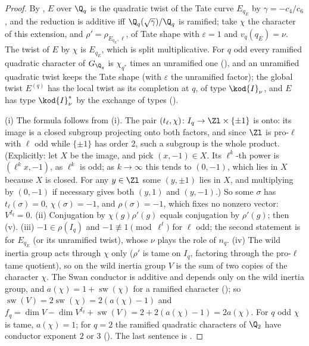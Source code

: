 \begin{proof}
By , $E$ over $\Q_q$ is the quadratic twist of the Tate curve $E_{q_E}$ by $\gamma=-c_4/c_6$, and the reduction is additive iff
$\Q_q(\sqrt\gamma)/\Q_q$ is ramified; take $\chi$ the character of this extension, and $\rho'=\rho_{E_{q_E},\ell}$, of Tate shape with $\varepsilon=1$ and
$v_q(q_E)=\nu$. The twist of $E$ by $\chi$ is $E_{q_E}$, which is split multiplicative. For $q$ odd every ramified quadratic character of $G_{\Q_q}$ is
$\chi_{q^*}$ times an unramified one (), and an unramified quadratic twist keeps the Tate shape (with $\varepsilon$ the unramified
factor); the global twist $E^{(q)}$ has the local twist as its completion at $q$, of type $\kod{I}_\nu$, and $E$ has type $\kod{I}_\nu^*$ by the
exchange of types ().

(i) The formula follows from (i). The pair $(t_\ell,\chi)\colon I_q\to\Zl\times\{\pm1\}$ is onto: its image is a closed subgroup
projecting onto both factors, and since $\Zl$ is pro-$\ell$ with $\ell$ odd while $\{\pm1\}$ has order $2$, such a subgroup is the whole product. (Explicitly: let
$X$ be the image, and pick $(x,-1)\in X$. Its $\ell^k$-th power is $(\ell^kx,-1)$, as $\ell^k$ is odd; as $k\to\infty$ this tends to $(0,-1)$, which lies in $X$ because $X$
is closed. For any $y\in\Zl$ some $(y,\pm1)$ lies in $X$, and multiplying by $(0,-1)$ if necessary gives both $(y,1)$ and $(y,-1)$.) So
some $\sigma$ has $t_\ell(\sigma)=0$, $\chi(\sigma)=-1$, and $\rho(\sigma)=-1$, which fixes no nonzero vector: $V^{I_q}=0$. (ii) Conjugation by $\chi(g)\rho'(g)$ equals
conjugation by $\rho'(g)$; then (v). (iii) $-1\in\rho(I_q)$ and $-1\not\equiv1\pmod{\ell^t}$ for $\ell$ odd; the second statement is
 for $E_{q_E}$ (or its unramified twist), whose $\nu$ plays the role of $n_q$. (iv) The wild inertia group acts
through $\chi$ only ($\rho'$ is tame on $I_q$, factoring through the pro-$\ell$ tame quotient), so on the wild inertia group $V$ is the sum of two copies of
the character $\chi$. The Swan conductor is additive and depends only on the wild inertia group, and $a(\chi)=1+\operatorname{sw}(\chi)$ for a ramified character
(); so $\operatorname{sw}(V)=2\operatorname{sw}(\chi)=2(a(\chi)-1)$ and
$f_q=\dim V-\dim V^{I_q}+\operatorname{sw}(V)=2+2(a(\chi)-1)=2a(\chi)$. For $q$ odd $\chi$ is tame, $a(\chi)=1$; for $q=2$ the ramified quadratic characters of
$\Q_2$ have conductor exponent $2$ or $3$ (). The last sentence is .
\end{proof}

